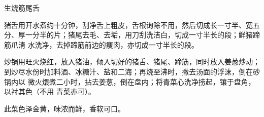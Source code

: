 \begin{recipe}{生烧筋尾舌}

\ingredients


\preparation

\step 猪舌用开水煮约十分钟，刮净舌上粗皮，舌根询除不用，然后切成长一寸半、宽五
分、厚一分半的片；猪尾去毛、去垢，用刀刮洗洁白，切成一寸半长的段；鲜猪蹄筋爪淸
水洗净，去掉蹄筋前边的痩肉，亦切成一寸半长的段。

\step 炒锅用旺火烧红，放入猪油，倾入切好的猪舌、猪尾、蹄筋，同时放入姜葱炒动；
到炒尽水份时加料酒、冰糖汁、盐和二海；再烧至沸时，撇去汤面的浮沫，倒在砂锅内以
微火煨煮二小时，拈去姜葱，倒在盘内；将青菜心洗净捞起，镶于盘角，以衬其色（不用
青菜亦可）。

\features

此菜色泽金黄，味浓而鲜，香软可口。

\end{recipe}

